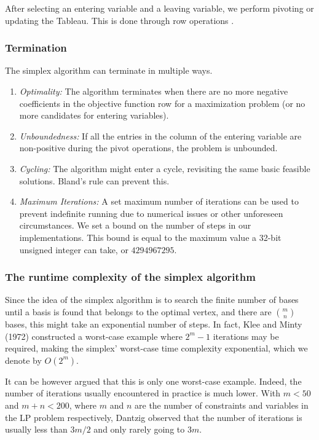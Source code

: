 After selecting an entering variable and a leaving variable, we perform pivoting or
updating the Tableau. This is done through row operations \parencite{chvatal1983linear}.

\subsubsection{Termination}
The simplex algorithm can terminate in multiple ways.
\begin{enumerate}
    \item \textit{Optimality:}
          The algorithm terminates when there are no more negative coefficients in the objective function
          row for a maximization problem (or no more candidates for entering variables).

    \item \textit{Unboundedness:}
          If all the entries in the column of the entering variable are non-positive during the pivot
          operations, the problem is unbounded.

    \item \textit{Cycling:}
          The algorithm might enter a cycle, revisiting the same basic feasible solutions. Bland's rule
          can prevent this.

    \item \textit{Maximum Iterations:}
          A set maximum number of iterations can be used to prevent indefinite running due to
          numerical issues or other unforeseen circumstances. We set a bound on the number of steps in our
          implementations. This bound is equal to the maximum value a 32-bit unsigned integer can take, or
          $4294967295$.
\end{enumerate}

\subsubsection{The runtime complexity of the simplex algorithm}
Since the idea of the simplex algorithm is to search the finite number of bases until a basis is
found that belongs to the optimal vertex, and there are $\binom{m}{n}$ bases, this might take an exponential number of steps. In fact, Klee and Minty (1972) \parencite{klee1972good} constructed a worst-case example where $2^m -1$ iterations may be required, making the simplex' worst-case time complexity exponential, which we denote by \( O(2^m) \).

It can be however argued that this is only one worst-case example. Indeed, the number
of iterations usually encountered in practice is much lower.
With $m<50$ and $m+n<200$, where $m$ and $n$ are the number of constraints and variables in the LP problem respectively, Dantzig \parencite{dantzig1990origins} observed that the number of iterations is usually less than $3m/2$ and only rarely going to $3m$. 

